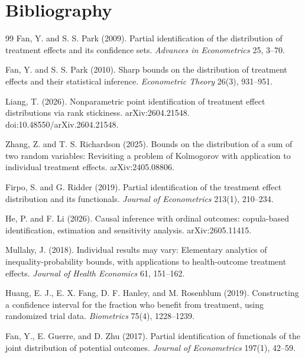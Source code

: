 \documentclass[11pt]{article}
\theoremstyle{definition}
\theoremstyle{plain}
\theoremstyle{remark}
\begin{document}
\section*{Bibliography}
\begin{thebibliography}{99}
Fan, Y. and S. S. Park (2009).
Partial identification of the distribution of treatment effects and its confidence sets.
\textit{Advances in Econometrics} 25, 3--70.

Fan, Y. and S. S. Park (2010).
Sharp bounds on the distribution of treatment effects and their statistical inference.
\textit{Econometric Theory} 26(3), 931--951.

Liang, T. (2026).
Nonparametric point identification of treatment effect distributions via rank stickiness.
arXiv:2604.21548.
doi:10.48550/arXiv.2604.21548.

Zhang, Z. and T. S. Richardson (2025).
Bounds on the distribution of a sum of two random variables: Revisiting a problem of Kolmogorov with application to individual treatment effects.
arXiv:2405.08806.

Firpo, S. and G. Ridder (2019).
Partial identification of the treatment effect distribution and its functionals.
\textit{Journal of Econometrics} 213(1), 210--234.

He, P. and F. Li (2026).
Causal inference with ordinal outcomes: copula-based identification, estimation and sensitivity analysis.
arXiv:2605.11415.

Mullahy, J. (2018).
Individual results may vary: Elementary analytics of inequality-probability bounds, with applications to health-outcome treatment effects.
\textit{Journal of Health Economics} 61, 151--162.

Huang, E. J., E. X. Fang, D. F. Hanley, and M. Rosenblum (2019).
Constructing a confidence interval for the fraction who benefit from treatment, using randomized trial data.
\textit{Biometrics} 75(4), 1228--1239.

Fan, Y., E. Guerre, and D. Zhu (2017).
Partial identification of functionals of the joint distribution of potential outcomes.
\textit{Journal of Econometrics} 197(1), 42--59.


\end{thebibliography}
\end{document}
